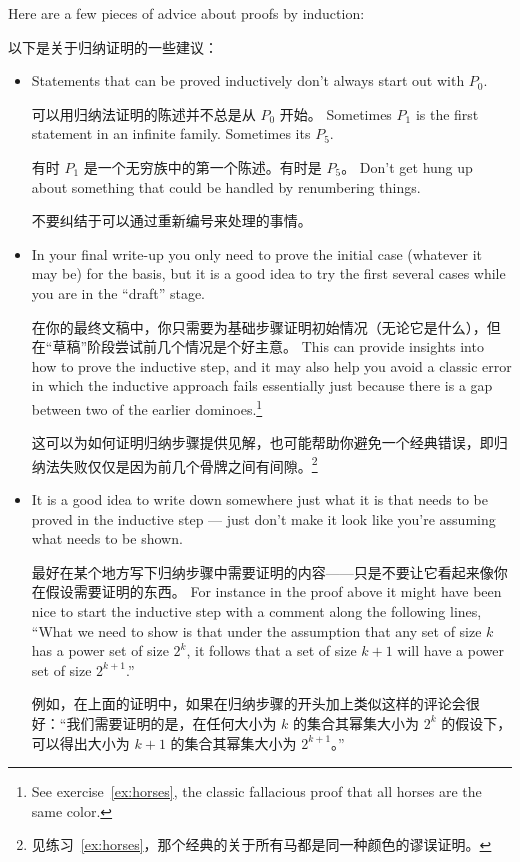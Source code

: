 Here are a few pieces
of advice about proofs by induction:

以下是关于归纳证明的一些建议：

\begin{itemize}
\item Statements that can be proved inductively don't always start out with 
$P_0$.

可以用归纳法证明的陈述并不总是从 $P_0$ 开始。
Sometimes $P_1$ is the first statement in an infinite family.
Sometimes its $P_5$.

有时 $P_1$ 是一个无穷族中的第一个陈述。有时是 $P_5$。
Don't get hung up about something that could be
handled by renumbering things.

不要纠结于可以通过重新编号来处理的事情。
\item In your final write-up you only need to prove the initial case
(whatever it may be) for the basis, but it is a good idea to try 
the first several cases while you are in the ``draft'' stage.

在你的最终文稿中，你只需要为基础步骤证明初始情况（无论它是什么），但在“草稿”阶段尝试前几个情况是个好主意。
This
can provide insights into how to prove the inductive step, and it may
also help you avoid a classic error in which the inductive approach fails
essentially just because there is a gap between two of the earlier 
dominoes.\footnote{See exercise~\ref{ex:horses}, the classic fallacious proof that all horses are the same color.}

这可以为如何证明归纳步骤提供见解，也可能帮助你避免一个经典错误，即归纳法失败仅仅是因为前几个骨牌之间有间隙。\footnote{见练习~\ref{ex:horses}，那个经典的关于所有马都是同一种颜色的谬误证明。}
\item It is a good idea to write down somewhere just what it is that
needs to be proved in the inductive step --- just don't make it look like 
you're assuming what needs to be shown.

最好在某个地方写下归纳步骤中需要证明的内容——只是不要让它看起来像你在假设需要证明的东西。
For instance in the proof above
it might have been nice to start the inductive step with a comment along
the following lines, ``What we need to show is that under the assumption
that any set of size $k$ has a power set of size $2^k$, it follows that
a set of size $k+1$ will have a power set of size $2^{k+1}$.'' 

例如，在上面的证明中，如果在归纳步骤的开头加上类似这样的评论会很好：“我们需要证明的是，在任何大小为 $k$ 的集合其幂集大小为 $2^k$ 的假设下，可以得出大小为 $k+1$ 的集合其幂集大小为 $2^{k+1}$。”
\end{itemize}
\medskip


